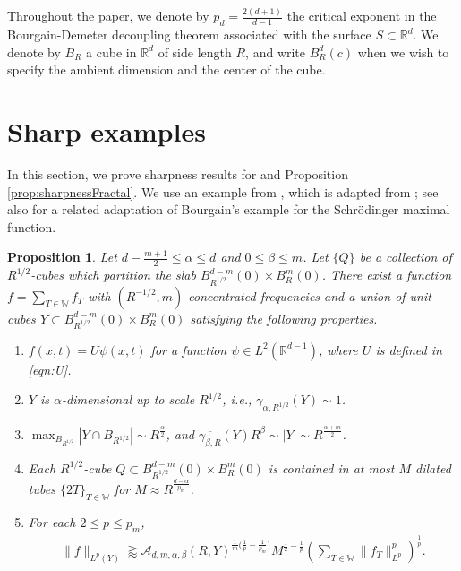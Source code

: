 \documentclass[11pt]{amsart}
\newtheorem{prop}[theorem]{Proposition}
\theoremstyle{definition}
\theoremstyle{remark}
\numberwithin{equation}{section}
\newcommand{\R}{\mathbb{R}}
\newcommand{\W}{\mathbb{W}}
\begin{document}
Throughout the paper, we denote by  $p_d = \frac{2(d+1)}{d-1}$ the critical exponent in the Bourgain-Demeter decoupling theorem \cite{BD} associated with the surface $S\subset \R^d$. We denote by $B_R$ a cube in $\R^d$ of side length $R$, and write $B_R^d(c)$ when we wish to specify the ambient dimension and the center of the cube.



\section{Sharp examples}\label{sec:sharpness}
In this section, we prove sharpness results for   and Proposition \ref{prop:sharpnessFractal}. We use an example from \cite{du2023weighted}, which is adapted from \cite{BBCRV}; see also \cite{DKWZ} for a related adaptation of Bourgain's example \cite{Bo_Sch} for the Schr\"odinger maximal function.
\begin{prop}\label{prop:sharpRefinedD}
	Let $d-\frac{m+1}{2}\leq \alpha \leq d$ and $0\leq \beta \leq m$. Let  $\{ Q\}$ be a collection of $R^{1/2}$-cubes which partition the slab $B^{d-m}_{R^{1/2}}(0) \times B^{m}_{R}(0)$. There exist a function $f=\sum_{T\in \W} f_T$ with $(R^{-1/2},m)$-concentrated frequencies and a union of unit cubes $Y \subset B^{d-m}_{R^{1/2}}(0) \times B^{m}_{R}(0)$ satisfying the following properties. 
	\begin{enumerate}[label=(\roman*)]
		\item $f(x,t) = U \psi (x,t)$ for a function $\psi \in L^2(\R^{d-1})$, where $U$ is defined in \eqref{eqn:U}.
		\item $Y$ is $\alpha$-dimensional up to scale $R^{1/2}$, i.e., $\gamma_{\alpha,R^{1/2}}(Y) \sim 1$. 
		\item $\max_{B_{R^{1/2}}} |Y\cap B_{R^{1/2}}| \sim R^{\frac{\alpha}{2}}$, and  $\overline{\gamma_{\beta, R}}(Y)  R^\beta \sim |Y| \sim R^{\frac{\alpha+m}{2}}$.
		\item Each $R^{1/2}$-cube $Q \subset B^{d-m}_{R^{1/2}}(0) \times B^{m}_{R}(0)$ is contained in at most $M$ dilated tubes $\{ 2T\}_{T\in \W}$ for $M\approx R^\frac{d-\alpha}{p_m}$.
		\item For each $2\leq p\leq p_m$, 
		\begin{align*}
			\| f\|_{L^p(Y)}  
			\gtrapprox \mathcal{A}_{d,m,\alpha,\beta}(R, Y)^{\frac{1}{m}\big(\frac{1}{p}-\frac{1}{p_m}\big)} M^{\frac{1}{2}-\frac{1}{p}} (\sum_{T\in \W} \| f_{T} \|_{L^p}^p)^{\frac{1}{p}}. 
		\end{align*}
	\end{enumerate}
\end{prop}
\end{document}
